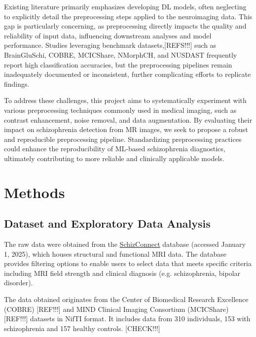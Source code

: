 Existing literature primarily emphasizes developing DL models, often neglecting to explicitly detail the preprocessing steps applied to the neuroimaging data. This gap is particularly concerning, as preprocessing directly impacts the quality and reliability of input data, influencing downstream analyses and model performance. Studies leveraging benchmark datasets,[REFS!!!] such as BrainGluSchi, COBRE, MCICShare, NMorphCH, and NUSDAST frequently report high classification accuracies, but the preprocessing pipelines remain inadequately documented or inconsistent, further complicating efforts to replicate findings.


To address these challenges, this project aims to systematically experiment with various preprocessing techniques commonly used in medical imaging, such as contrast enhancement, noise removal, and data augmentation. By evaluating their impact on schizophrenia detection from MR images, we seek to propose a robust and reproducible preprocessing pipeline. Standardizing preprocessing practices could enhance the reproducibility of ML-based schizophrenia diagnostics, ultimately contributing to more reliable and clinically applicable models.

\section{Methods}

\subsection{Dataset and Exploratory Data Analysis}

The raw data were obtained from the \href{http://schizconnect.org}{SchizConnect} database (accessed January 1, 2025), which houses structural and functional MRI data. The database provides filtering options to enable users to select data that meets specific criteria including MRI field strength and clinical diagnosis (e.g. schizophrenia, bipolar disorder).

The data obtained originates from the Center of Biomedical Research Excellence (COBRE) [REF!!!] and MIND Clinical Imaging Consortium (MCICShare) [REF!!!] datasets in NifTI format. It includes data from 310 individuals, 153 with schizophrenia and 157 healthy controls. [CHECK!!!]

